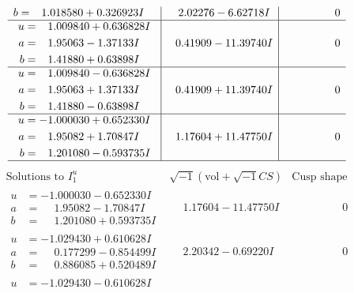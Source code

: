 \documentclass[1p]{elsarticle_modified}
\theoremstyle{definition}
\newcommand{\I}{\sqrt{-1}}
\begin{document}
$$\begin{array}{c|c|c}
\begin{aligned}
b &= \phantom{-}1.018580 + 0.326923 I\end{aligned}
 & \phantom{-}2.02276 - 6.62718 I & \phantom{-0.000000 } 0 \\ \hline\begin{aligned}
u &= \phantom{-}1.009840 + 0.636828 I \\
a &= \phantom{-}1.95063 - 1.37133 I \\
b &= \phantom{-}1.41880 + 0.63898 I\end{aligned}
 & \phantom{-}0.41909 - 11.39740 I & \phantom{-0.000000 } 0 \\ \hline\begin{aligned}
u &= \phantom{-}1.009840 - 0.636828 I \\
a &= \phantom{-}1.95063 + 1.37133 I \\
b &= \phantom{-}1.41880 - 0.63898 I\end{aligned}
 & \phantom{-}0.41909 + 11.39740 I & \phantom{-0.000000 } 0 \\ \hline\begin{aligned}
u &= -1.000030 + 0.652330 I \\
a &= \phantom{-}1.95082 + 1.70847 I \\
b &= \phantom{-}1.201080 - 0.593735 I\end{aligned}
 & \phantom{-}1.17604 + 11.47750 I & \phantom{-0.000000 } 0\\
 \hline 
 \end{array}$$\newpage$$\begin{array}{c|c|c}  
\text{Solutions to }I^u_{1}& \I (\text{vol} + \sqrt{-1}CS) & \text{Cusp shape}\\
 \hline 
\begin{aligned}
u &= -1.000030 - 0.652330 I \\
a &= \phantom{-}1.95082 - 1.70847 I \\
b &= \phantom{-}1.201080 + 0.593735 I\end{aligned}
 & \phantom{-}1.17604 - 11.47750 I & \phantom{-0.000000 } 0 \\ \hline\begin{aligned}
u &= -1.029430 + 0.610628 I \\
a &= \phantom{-}0.177299 - 0.854499 I \\
b &= \phantom{-}0.886085 + 0.520489 I\end{aligned}
 & \phantom{-}2.20342 - 0.69220 I & \phantom{-0.000000 } 0 \\ \hline\begin{aligned}
u &= -1.029430 - 0.610628 I \\

\end{aligned}
\end{array}$$
\end{document}

